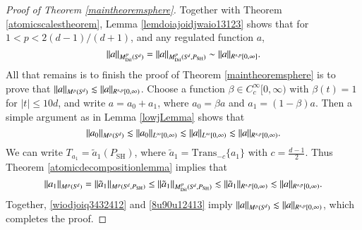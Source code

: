 \begin{proof}[Proof of Theorem \ref{maintheoremsphere}]
Together with Theorem \ref{atomicscalestheorem}, Lemma \ref{lemdoiajoidjwaio13123} shows that for $1 < p < 2(d-1)/(d+1)$, and any regulated function $a$,
%
\[ \| a \|_{M^p_{\text{Dil}}({S}^{\!{d}})} = \| a \|_{M^p_{\text{Dil}}({S}^{\!{d}},P_{\text{SH}})} \sim \| a \|_{R^{s,p}[0,\infty]}. \]
%
All that remains is to finish the proof of Theorem \ref{maintheoremsphere} is to prove that $\| a \|_{M^p({S}^{\!{d}})} \lesssim \| a \|_{R^{s,p}[0,\infty)}$. Choose a function $\beta \in C_c^\infty[0,\infty)$ with $\beta(t) = 1$ for $|t| \leq 10d$, and write $a = a_0 + a_1$, where $a_0 = \beta a$ and $a_1 = (1 - \beta) a$. Then a simple argument as in Lemma \ref{lowjLemma} shows that
%
\begin{equation} \label{wiodjoiq3432412}
    \| a_0 \|_{M^p({S}^{\!{d}})} \lesssim \| a_0 \|_{L^\infty[0,\infty)} \lesssim \| a \|_{L^\infty[0,\infty)} \lesssim \| a \|_{R^{s,p}[0,\infty)}.
\end{equation}
%
We can write $T_{a_1} = \tilde{a}_1(P_{\text{SH}})$, where $\tilde{a}_1 = \text{Trans}_{-c}\{ a_1 \}$ with $c = \tfrac{d-1}{2}$. Thus Theorem \ref{atomicdecompositionlemma} implies that
%
\begin{equation} \label{8u90u12413}
    \| a_1 \|_{M^p({S}^{\!{d}})} = \| \tilde{a}_1 \|_{M^p({S}^{\!{d}}, P_{\text{SH}})} \leq \| \tilde{a}_1 \|_{M^p_{\text{Dil}}({S}^{\!{d}}, P_{\text{SH}})} \lesssim \| \tilde{a}_1 \|_{R^{s,p}[0,\infty)} \lesssim \| a \|_{R^{s,p}[0,\infty)}.
\end{equation}
%
Together, \eqref{wiodjoiq3432412} and \eqref{8u90u12413} imply $\| a \|_{M^p({S}^{\!{d}})} \lesssim \| a \|_{R^{s,p}[0,\infty)}$, which completes the proof.
%
%
\end{proof}
